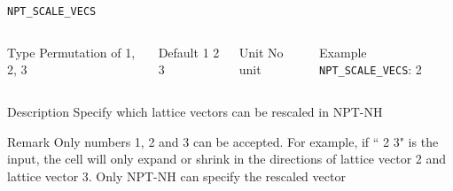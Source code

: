 \begin{frame}[allowframebreaks]{\texttt{NPT\_SCALE\_VECS}} \label{NPT_SCALE_VECS}
\vspace*{-12pt}
\begin{columns}
\begin{block}{Type}
Permutation of 1, 2, 3
\end{block}

\begin{block}{Default}
1 2 3
\end{block}

\begin{block}{Unit}
No unit
\end{block}

\begin{block}{Example}
\texttt{NPT\_SCALE\_VECS}: 2
\end{block}
\end{columns}

\begin{block}{Description}
Specify which lattice vectors can be rescaled in NPT-NH
\end{block}

\begin{block}{Remark}
Only numbers 1, 2 and 3 can be accepted. For example, if `` 2 3" is the input, the cell will only expand or shrink in the directions of lattice vector 2 and lattice vector 3. Only NPT-NH can specify the rescaled vector
\end{block}

\end{frame}



